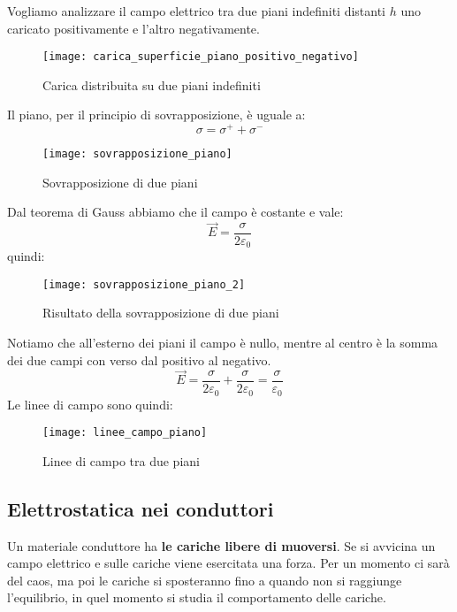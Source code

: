 \documentclass[a4paper]{article}
\begin{document}
\begin{example}
  Vogliamo analizzare il campo elettrico tra due piani indefiniti distanti \( h \) uno
  caricato positivamente e l'altro negativamente.
  \begin{figure}[H]
    \centering
    \texttt{[image: carica\_superficie\_piano\_positivo\_negativo]}
    \caption{Carica distribuita su due piani indefiniti}
  \end{figure}
  \noindent
  Il piano, per il principio di sovrapposizione, è uguale a:
  \[
    \sigma = \sigma ^+ + \sigma ^-
  \] 
  \begin{figure}[H]
    \centering
    \texttt{[image: sovrapposizione\_piano]}
    \caption{Sovrapposizione di due piani}
  \end{figure}
  \noindent
  Dal teorema di Gauss abbiamo che il campo è costante e vale:
  \[
    \vec{E} = \frac{\sigma}{2 \varepsilon_0}
  \] 
  quindi:
  \begin{figure}[H]
    \centering
    \texttt{[image: sovrapposizione\_piano\_2]}
    \caption{Risultato della sovrapposizione di due piani}
  \end{figure}
  \noindent
  Notiamo che all'esterno dei piani il campo è nullo, mentre al centro è la somma
  dei due campi con verso dal positivo al negativo.
  \[
    \vec{E} = \frac{\sigma}{2\varepsilon_0} + \frac{\sigma}{2\varepsilon_0} =
    \frac{\sigma}{\varepsilon_0}
  \] 
  Le linee di campo sono quindi:
  \begin{figure}[H]
    \centering
    \texttt{[image: linee\_campo\_piano]}
    \caption{Linee di campo tra due piani}
  \end{figure}
\end{example}

\subsection{Elettrostatica nei conduttori}
Un materiale conduttore ha \textbf{le cariche libere di muoversi}. Se si avvicina un
campo elettrico e sulle cariche viene esercitata una forza. Per un momento ci sarà
del caos, ma poi le cariche si sposteranno fino a quando non si raggiunge l'equilibrio,
in quel momento si studia il comportamento delle cariche.
\end{document}
